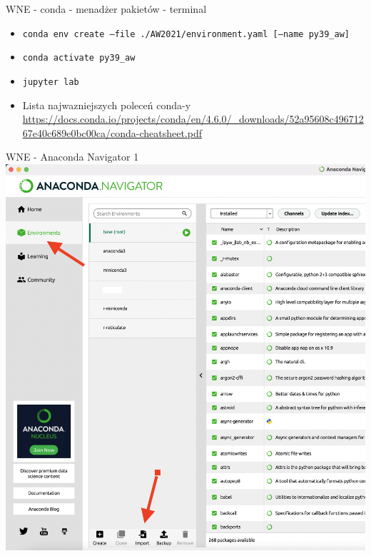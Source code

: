 \documentclass{beamer}
\begin{document}
\begin{frame}{WNE - conda - menadżer pakietów - terminal}
\begin{itemize}
  \item \texttt{conda env create --file ./AW2021/environment.yaml [--name py39\_aw]}
  \item \texttt{conda activate py39\_aw}
  \item \texttt{jupyter lab}
  \item Lista najwazniejszych poleceń conda-y \url{https://docs.conda.io/projects/conda/en/4.6.0/_downloads/52a95608c49671267e40c689e0bc00ca/conda-cheatsheet.pdf}
  \end{itemize}
\end{frame}

\begin{frame}{WNE - Anaconda Navigator 1}
  \includegraphics[scale = 0.20]{anaconda_navigator_1.png}
\end{frame}
\end{document}
